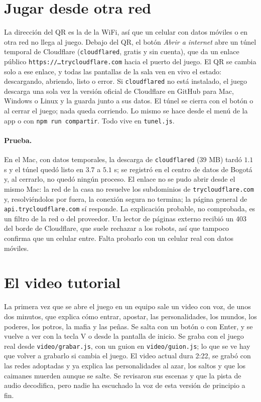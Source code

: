 \documentclass[11pt,letterpaper]{article}
\begin{document}
\section{Jugar desde otra red}
La dirección del QR es la de la WiFi, así que un celular con datos móviles o en otra red no llega al juego. Debajo del QR, el botón \emph{Abrir a internet} abre un túnel temporal de Cloudflare (\texttt{cloudflared}, gratis y sin cuenta), que da un enlace público \texttt{https://…trycloudflare.com} hacia el puerto del juego. El QR se cambia solo a ese enlace, y todas las pantallas de la sala ven en vivo el estado: descargando, abriendo, listo o error. Si \texttt{cloudflared} no está instalado, el juego descarga una sola vez la versión oficial de Cloudflare en GitHub para Mac, Windows o Linux y la guarda junto a sus datos. El túnel se cierra con el botón o al cerrar el juego; nada queda corriendo. Lo mismo se hace desde el menú de la app o con \texttt{npm run compartir}. Todo vive en \texttt{tunel.js}.

\paragraph{Prueba.} En el Mac, con datos temporales, la descarga de \texttt{cloudflared} (39 MB) tardó $1.1$ s y el túnel quedó listo en $3.7$ a $5.1$ s; se registró en el centro de datos de Bogotá y, al cerrarlo, no quedó ningún proceso. El enlace no se pudo abrir desde el mismo Mac: la red de la casa no resuelve los subdominios de \texttt{trycloudflare.com} y, resolviéndolos por fuera, la conexión segura no termina; la página general de \texttt{api.trycloudflare.com} sí responde. La explicación probable, no comprobada, es un filtro de la red o del proveedor. Un lector de páginas externo recibió un 403 del borde de Cloudflare, que suele rechazar a los robots, así que tampoco confirma que un celular entre. Falta probarlo con un celular real con datos móviles.

\section{El video tutorial}
La primera vez que se abre el juego en un equipo sale un video con voz, de unos dos minutos, que explica cómo entrar, apostar, las personalidades, los mundos, los poderes, los potros, la mafia y las peñas. Se salta con un botón o con Enter, y se vuelve a ver con la tecla V o desde la pantalla de inicio. Se graba con el juego real desde \texttt{video/grabar.js}, con un guion en \texttt{video/guion.js}; lo que se ve hay que volver a grabarlo si cambia el juego. El video actual dura 2:22, se grabó con las redes adoptadas y ya explica las personalidades al azar, los saltos y que los caimanes muerden aunque se salte. Se revisaron sus escenas y que la pista de audio decodifica, pero nadie ha escuchado la voz de esta versión de principio a fin.
\end{document}
